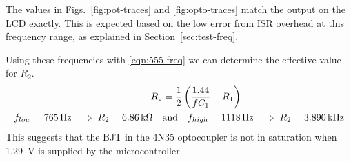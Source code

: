 The values in Figs.~\ref{fig:pot-traces} and \ref{fig:opto-traces} match the output on the LCD exactly.
This is expected based on the low error from ISR overhead at this frequency range, as explained in Section~\ref{sec:test-freq}.

Using these frequencies with \eqref{eqn:555-freq} we can determine the effective value for $R_2$.
\begin{align*}
  R_2 &= {1 \over 2}\left({1.44 \over f C_1} - R_1\right) \\
  f_{low} = \SI{765}{\hertz} \implies R_2 = \SI{6.86}{\kilo\ohm} \quad 
  &\text{and} \quad f_{high} = \SI{1118}{\hertz} \implies R_2 = \SI{3.890}{\kilo\hertz}
\end{align*}
This suggests that the BJT in the 4N35 optocoupler is not in saturation when \SI{1.29}{\volt} is supplied by the microcontroller.
